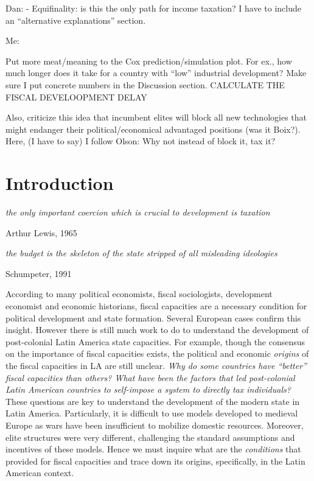 \documentclass[onesided]{article}\usepackage[]{graphicx}\usepackage[]{color}
\begin{document}
 Dan: 
 	- Equifinality: is this the only path for income taxation? I have to include an ``alternative explanations'' section. 

 Me: 

 Put more meat/meaning to the Cox prediction/simulation plot. For ex., how much longer does it take for a country with ``low'' industrial development? Make sure I put concrete numbers in the Discussion section. CALCULATE THE FISCAL DEVELOOPMENT DELAY

 Also, criticize this idea that incumbent elites will block all new technologies that might endanger their political/economical advantaged  positions (was it Boix?). Here, (I have to say) I follow Olson: Why not instead of block it, tax it?



\newpage


\section{Introduction}

\epigraph{\emph{the only important coercion which is crucial to development is taxation}}{Arthur Lewis, 1965}

\epigraph{\emph{the budget is the skeleton of the state stripped of all misleading ideologies}}{Schumpeter, 1991}



 According  to many political economists, fiscal sociologists, development economist and economic historians, fiscal capacities are a necessary condition for political development and state formation. Several European cases confirm this insight. However there is still much work to do to understand the development of post-colonial Latin America state capacities. For example, though the consensus on the importance of fiscal capacities exists, the political and economic \emph{origins} of the fiscal capacities in LA  are still unclear. \emph{Why do some countries have ``better'' fiscal capacities than others? What have been the factors that led post-colonial Latin American countries to self-impose a system to directly tax individuals?} These questions are key to understand the development of the modern state in Latin America. Particularly, it is difficult to use models developed to medieval Europe as wars have been insufficient to mobilize domestic resources. Moreover, elite structures were very different, challenging the standard assumptions and incentives of these models. Hence we must inquire what are the \emph{conditions} that provided for fiscal capacities and trace down its origins, specifically, in the Latin American context.
\end{document}
